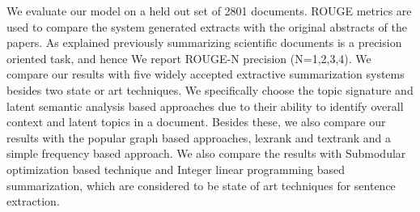We evaluate our model on a held out set of 2801 documents. ROUGE metrics\cite{lin2004rouge} are used to compare the system generated extracts with the original abstracts of the papers. As explained previously summarizing scientific documents is a precision oriented task, and hence We report ROUGE-N precision (N=1,2,3,4). We compare our results with five widely accepted extractive summarization systems besides two state or art techniques. We specifically choose the topic signature\cite{lin2000automated} and latent semantic analysis\cite{steinberger2004using} based approaches due to their ability to identify overall context and latent topics in a document. Besides these, we also compare our results with the popular graph based approaches, lexrank\cite{erkan2004lexrank} and textrank\cite{mihalcea2004textrank} and a simple frequency based approach. We also compare the results with Submodular optimization based technique\cite{lin2012learning} and Integer linear programming based summarization\cite{gillick2009scalable}, which are considered to be state of art techniques for sentence extraction\cite{hong2014repository}.\\

